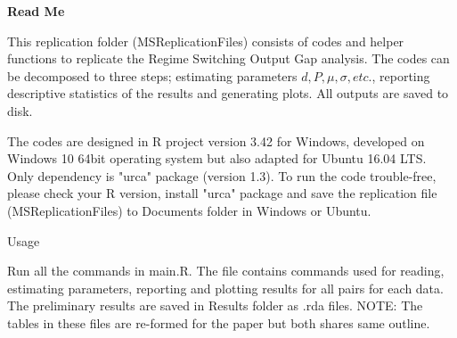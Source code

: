 \documentclass{article}
\begin{document}
\begin{center}
	\Large \bf Read Me 
\end{center}
This replication folder (MSReplicationFiles) consists of codes and helper functions to replicate the Regime Switching Output Gap analysis. The codes can be decomposed to three steps; estimating parameters $ d,P,\mu,\sigma, etc. $, reporting descriptive statistics of the results and generating plots. All outputs are saved to disk.

The codes are designed in R project version 3.42 for Windows, developed on Windows 10 64bit operating system but also adapted for Ubuntu 16.04 LTS. Only dependency is "urca" package (version 1.3). To run the code trouble-free, please check your R version, install "urca" package and save the replication file (MSReplicationFiles) to Documents folder in Windows or Ubuntu.
\sloppy
\begin{flushleft}
	\large Usage
\end{flushleft}
Run all the commands in main.R. The file contains commands used for reading, estimating parameters, reporting and plotting results for all pairs for each data. The preliminary results are saved in Results folder as .rda files. NOTE: The tables in these files are re-formed for the paper but both shares same outline.
\end{document}

